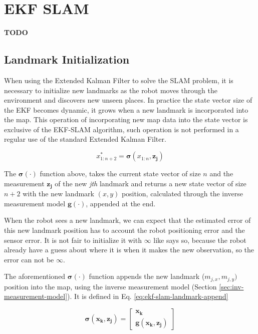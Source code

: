 \documentclass[12pt]{article}
\newcommand{\bvec}[1]{\boldsymbol{\mathbf{#1}}} %
\newcommand{\mb}[1]{{\boldsymbol{#1}}} %
\newcommand{\blue}[1]{\color{blue}#1\color{black}}
\begin{document}
\section{EKF SLAM}
\blue{\textbf{TODO}}

\subsection{Landmark Initialization}
When using the Extended Kalman Filter to solve the SLAM problem, it is necessary 
to initialize new landmarks as the robot moves through the environment and 
discovers new unseen places. In practice the state vector size of the 
EKF becomes dynamic, it grows when a new landmark is incorporated into 
the map. This operation of incorporating new map data into the state vector is
exclusive of the EKF-SLAM algorithm, such operation is not performed in a 
regular use of the standard Extended Kalman Filter.

\begin{equation}
    x^*_{1:n+2} = \mb{\sigma}(x_{1:n}, \bvec{z_j})
\end{equation}

The $\mb{\sigma}(\cdot)$ function above, takes the current state vector of size 
$n$ and the measurement $\bvec{z_j}$ of the new \textit{jth} landmark and 
returns a new state vector of size $n+2$ with the new landmark $(x, y)$ 
position, calculated through the inverse measurement model $\mb{g}(\cdot)$, 
appended at the end.

When the robot sees a new landmark, we can expect that the estimated error of 
this new landmark position has to account the robot positioning error and the 
sensor error. It is not fair to initialize it with $\infty$ like 
\cite[p.~ 317]{bongard2006probabilistic} says so, because the robot already 
have a guess about where it is when it makes the new observation, so the error 
can not be $\infty$.

The aforementioned $\mb{\sigma}(\cdot)$ function appends the new landmark 
($m_{j,x}, m_{j,y})$ position into the map, using the inverse measurement model 
(Section \ref{sec:inv-measurement-model}). It is defined in Eq. 
\ref{eq:ekf-slam-landmark-append}

\begin{equation}
    \mb{\sigma}(\bvec{x_k, z_j}) = \begin{bmatrix}
        \bvec{x_k} \\
        \mb{g}(\bvec{x_k}, \bvec{z_j})
    \end{bmatrix}
    \label{eq:ekf-slam-landmark-append}
\end{equation}
\end{document}
